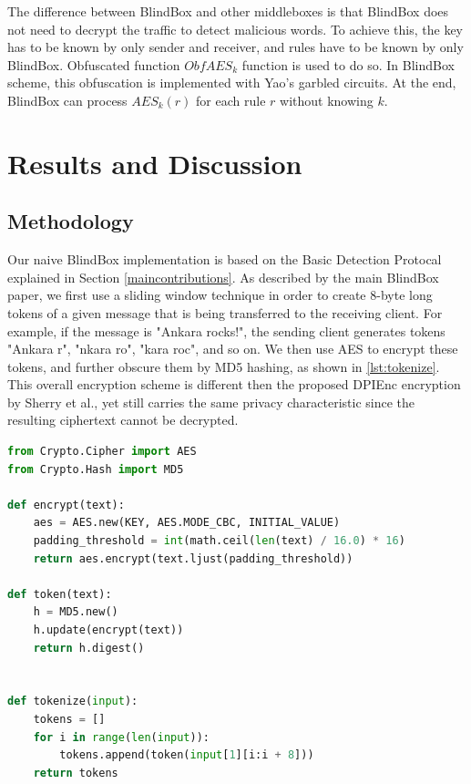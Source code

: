 \documentclass{winslabreport}
\begin{document}
The difference between BlindBox and other middleboxes is that BlindBox does not need to decrypt the traffic to detect malicious words. To achieve this, the key has to be known by only sender and receiver, and rules have to be known by only BlindBox. Obfuscated function $ObfAES_k$ function is used to do so. In BlindBox scheme, this obfuscation is implemented with Yao’s\cite{chi,chii} garbled circuits. At the end, BlindBox can process $AES_k(r)$ for each rule $r$ without knowing $k$. 

\section{Results and Discussion}

\subsection{Methodology} \label{methodology}

Our naive BlindBox implementation is based on the Basic Detection Protocal explained in Section \ref{maincontributions}. As described by the main BlindBox paper, we first use a sliding window technique in order to create 8-byte long tokens of a given message that is being transferred to the receiving client. For example, if the message is "Ankara rocks!", the sending client generates tokens "Ankara r", "nkara ro", "kara roc", and so on. We then use AES to encrypt these tokens, and further obscure them by MD5 hashing, as shown in \autoref{lst:tokenize}. This overall encryption scheme is different then the proposed DPIEnc encryption by Sherry et al., yet still carries the same privacy characteristic since the resulting ciphertext cannot be decrypted.

\begin{lstlisting}[caption={Tokenization},label={lst:tokenize},language=Python]
from Crypto.Cipher import AES
from Crypto.Hash import MD5

def encrypt(text):
    aes = AES.new(KEY, AES.MODE_CBC, INITIAL_VALUE)
    padding_threshold = int(math.ceil(len(text) / 16.0) * 16)
    return aes.encrypt(text.ljust(padding_threshold))

def token(text):
    h = MD5.new()
    h.update(encrypt(text))
    return h.digest()
    
    
def tokenize(input):
    tokens = []
    for i in range(len(input)):
        tokens.append(token(input[1][i:i + 8]))
    return tokens
\end{lstlisting}
\end{document}
